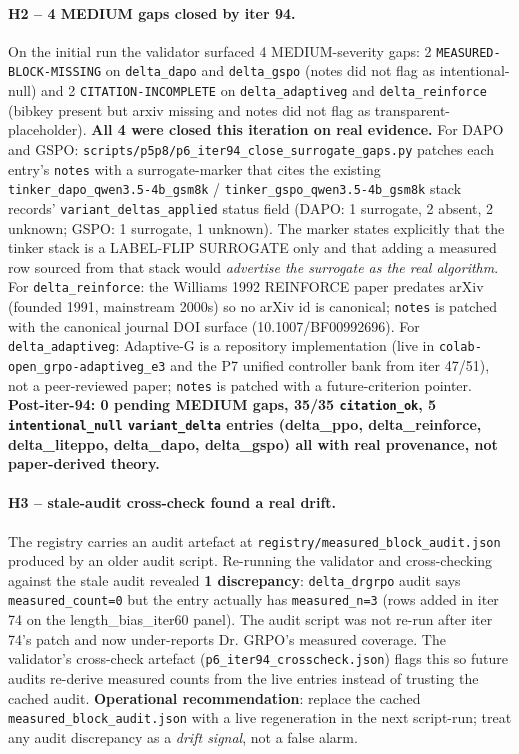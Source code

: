\paragraph{H2 -- 4 MEDIUM gaps closed by iter 94.}
On the initial run the validator surfaced 4 MEDIUM-severity gaps: 2
\texttt{MEASURED-BLOCK-MISSING} on \texttt{delta\_dapo} and \texttt{delta\_gspo}
(notes did not flag as intentional-null) and 2 \texttt{CITATION-INCOMPLETE}
on \texttt{delta\_adaptiveg} and \texttt{delta\_reinforce} (bibkey present but
arxiv missing and notes did not flag as transparent-placeholder).
\textbf{All 4 were closed this iteration on real evidence.}
For DAPO and GSPO: \texttt{scripts/p5p8/p6\_iter94\_close\_surrogate\_gaps.py}
patches each entry's \texttt{notes} with a surrogate-marker that cites the
existing \texttt{tinker\_dapo\_qwen3.5-4b\_gsm8k} / \texttt{tinker\_gspo\_qwen3.5-4b\_gsm8k}
stack records' \texttt{variant\_deltas\_applied} status field (DAPO: 1 surrogate,
2 absent, 2 unknown; GSPO: 1 surrogate, 1 unknown). The marker states explicitly
that the tinker stack is a LABEL-FLIP SURROGATE only and that adding a measured
row sourced from that stack would \emph{advertise the surrogate as the real
algorithm}. For \texttt{delta\_reinforce}: the Williams 1992 REINFORCE paper
predates arXiv (founded 1991, mainstream 2000s) so no arXiv id is canonical;
\texttt{notes} is patched with the canonical journal DOI surface
(10.1007/BF00992696). For \texttt{delta\_adaptiveg}: Adaptive-G is a repository
implementation (live in \texttt{colab-open\_grpo-adaptiveg\_e3} and the P7
unified controller bank from iter 47/51), not a peer-reviewed paper;
\texttt{notes} is patched with a future-criterion pointer.
\textbf{Post-iter-94: 0 pending MEDIUM gaps, 35/35 \texttt{citation\_ok},
5 \texttt{intentional\_null} \texttt{variant\_delta} entries (delta\_ppo,
delta\_reinforce, delta\_liteppo, delta\_dapo, delta\_gspo) all with real
provenance, not paper-derived theory.}

\paragraph{H3 -- stale-audit cross-check found a real drift.}
The registry carries an audit artefact at
\texttt{registry/measured\_block\_audit.json} produced by an older audit
script. Re-running the validator and cross-checking against the stale audit
revealed \textbf{1 discrepancy}: \texttt{delta\_drgrpo} audit says
\texttt{measured\_count=0} but the entry actually has \texttt{measured\_n=3}
(rows added in iter 74 on the length\_bias\_iter60 panel). The audit script
was not re-run after iter 74's patch and now under-reports Dr. GRPO's
measured coverage. The validator's cross-check artefact
(\texttt{p6\_iter94\_crosscheck.json}) flags this so future audits re-derive
measured counts from the live entries instead of trusting the cached audit.
\textbf{Operational recommendation}: replace the cached
\texttt{measured\_block\_audit.json} with a live regeneration in the next
script-run; treat any audit discrepancy as a \emph{drift signal}, not a
false alarm.

